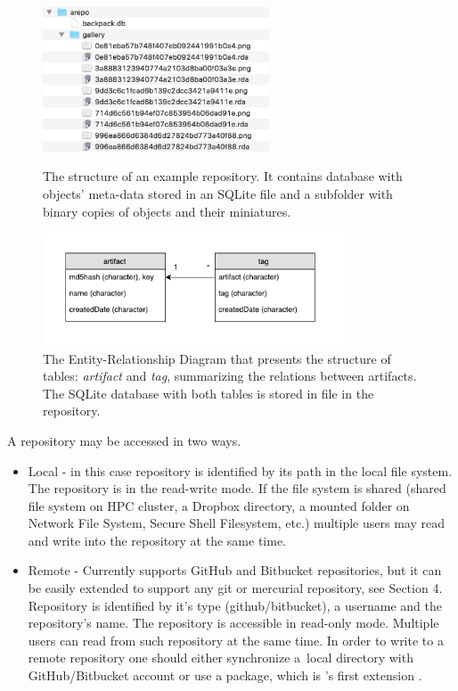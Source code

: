 \documentclass[nojss]{jss}\usepackage[]{graphicx}\usepackage[]{color}
\begin{document}
\begin{figure}[b!]
\centering
\includegraphics[width=0.6\textwidth]{Figures/dir.jpg}
\caption{\label{fig:dirb}The structure of an example  repository. It contains database with objects' meta-data stored in an SQLite file  and a subfolder  with binary copies of  objects and their miniatures.}

\centering
\includegraphics[width=0.8\textwidth]{Figures/archivistERD.pdf}
\caption{\label{ERD}The Entity-Relationship Diagram that presents the structure of tables: \textit{artifact} and \textit{tag}, summarizing the relations between artifacts. The SQLite database with both tables is stored in  file in the repository.}
\end{figure}

A repository may be accessed in two ways.
\begin{itemize}
\item Local - in this case repository is identified by its path in the local file system. The repository is in the read-write mode. If the file system is shared (shared file system on HPC cluster, a Dropbox directory, a mounted folder on Network File System, Secure Shell Filesystem, etc.) multiple users may read and write into the repository at the same time. 
\item { Remote} - {Currently  supports GitHub and Bitbucket repositories, but it can be easily extended to support any git or mercurial repository, see Section 4.} Repository is identified by it's type (github/bitbucket), a username and the repository's name. The repository is accessible in read-only mode. Multiple users can read from such repository at the same time. 
In order to write to a remote repository one should either synchronize a~local directory with GitHub/Bitbucket account or use a  package, which is 's first extension \citep[see][]{archivist.github}.
\end{itemize}
\end{document}
